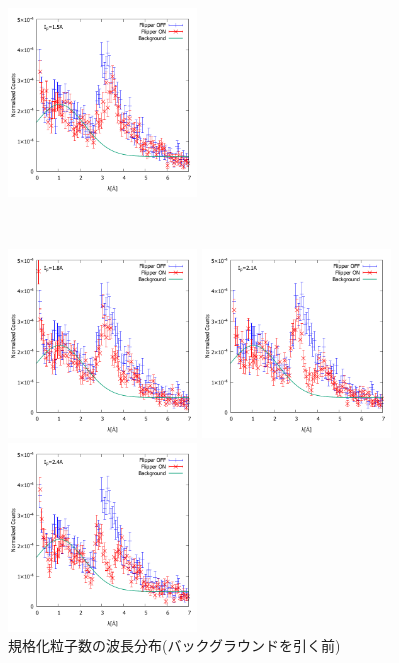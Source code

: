 \begin{figure}[h]
\begin{minipage}{0.33\hsize}
\end{minipage}
\begin{minipage}{0.33\hsize}
\includegraphics[width=5cm]{discussion/NC/NormalizedCounts_15A.pdf}
\end{minipage}\\
\begin{minipage}{0.33\hsize}
\includegraphics[width=5cm]{discussion/NC/NormalizedCounts_18A.pdf}
\end{minipage}
\begin{minipage}{0.33\hsize}
\includegraphics[width=5cm]{discussion/NC/NormalizedCounts_21A.pdf}
\end{minipage}
\begin{minipage}{0.33\hsize}
\includegraphics[width=5cm]{discussion/NC/NormalizedCounts_24A.pdf}
\end{minipage}
\caption{規格化粒子数の波長分布(バックグラウンドを引く前)}\label{Discussion2_fig_NC}
\end{figure}


